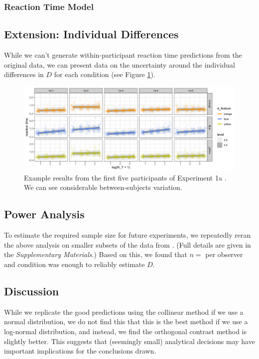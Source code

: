 \documentclass[smallextended]{svjour3}       %
\begin{document}
\subsubsection{Reaction Time Model}

\subsection{Extension: Individual Differences}

While we can't generate within-participant reaction time predictions from the original data, we can present data on the uncertainty around the individual differences in $D$ for each condition (see Figure \ref{fig:buetti2019_people}).

\begin{figure}
\centering
\includegraphics[width=\textwidth]{../wd_reanalyse_Buetti2019/exp1_fits.png}
\caption{Example results from the first five participants of Experiment 1a \cite{buetti2019predicting}. We can see considerable between-subjects variation. }
\label{fig:buetti2019_people}
\end{figure}

\subsection{Power Analysis}
\label{sec:power}

To estimate the required sample size for future experiments, we repeatedly reran the above analysis on smaller subsets of the data from \cite{buetti2019predicting}. (Full details are given in the \textit{Supplementary Materials}.) Based on this, we found that $n = $ per observer and condition was enough to reliably estimate $D$. 

\subsection{Discussion}

While we replicate the good predictions using the collinear method if we use a normal distribution, we do not find this that this is the best method if we use a log-normal distribution, and instead, we find the orthogonal contrast method is slightly better. This suggests that (seemingly small) analytical decisions may have important implications for the conclusions drawn. 
\end{document}

